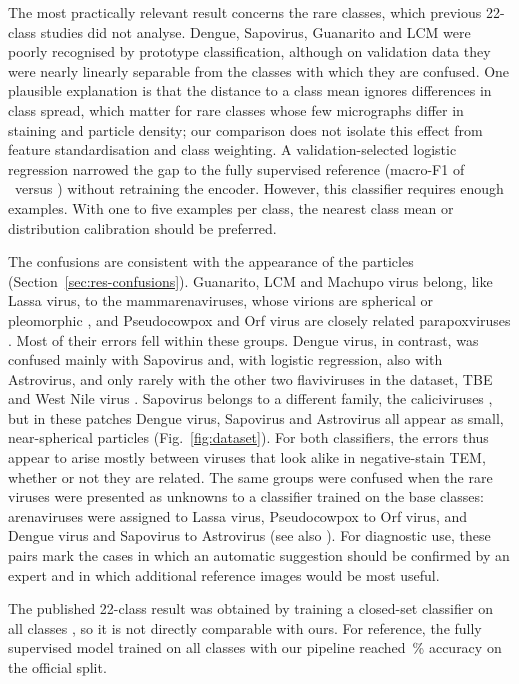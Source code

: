 \documentclass[preprint,review,12pt]{elsarticle}
\begin{document}
The most practically relevant result concerns the rare classes, which previous 22-class studies did not analyse. Dengue, Sapovirus, Guanarito and LCM were poorly recognised by prototype classification, although on validation data they were nearly linearly separable from the classes with which they are confused. One plausible explanation is that the distance to a class mean ignores differences in class spread, which matter for rare classes whose few micrographs differ in staining and particle density; our comparison does not isolate this effect from feature standardisation and class weighting. A validation-selected logistic regression narrowed the gap to the fully supervised reference (macro-F1 of \SiamLrFOneMean\ versus \CeFOne) without retraining the encoder. However, this classifier requires enough examples. With one to five examples per class, the nearest class mean or distribution calibration should be preferred.

The confusions are consistent with the appearance of the particles (Section~\ref{sec:res-confusions}). Guanarito, LCM and Machupo virus belong, like Lassa virus, to the mammarenaviruses, whose virions are spherical or pleomorphic \cite{Rad23}, and Pseudocowpox and Orf virus are closely related parapoxviruses \cite{McI23}. Most of their errors fell within these groups. Dengue virus, in contrast, was confused mainly with Sapovirus and, with logistic regression, also with Astrovirus, and only rarely with the other two flaviviruses in the dataset, TBE and West Nile virus \cite{Sim17}. Sapovirus belongs to a different family, the caliciviruses \cite{Vin19}, but in these patches Dengue virus, Sapovirus and Astrovirus all appear as small, near-spherical particles (Fig.~\ref{fig:dataset}). For both classifiers, the errors thus appear to arise mostly between viruses that look alike in negative-stain TEM, whether or not they are related. The same groups were confused when the rare viruses were presented as unknowns to a classifier trained on the base classes: arenaviruses were assigned to Lassa virus, Pseudocowpox to Orf virus, and Dengue virus and Sapovirus to Astrovirus \cite{MS22} (see also \cite{Vol26}). For diagnostic use, these pairs mark the cases in which an automatic suggestion should be confirmed by an expert and in which additional reference images would be most useful.

The published 22-class result was obtained by training a closed-set classifier on all classes \cite{U24}, so it is not directly comparable with ours. For reference, the fully supervised model trained on all classes with our pipeline reached \CeAcc\,\% accuracy on the official split.
\end{document}
